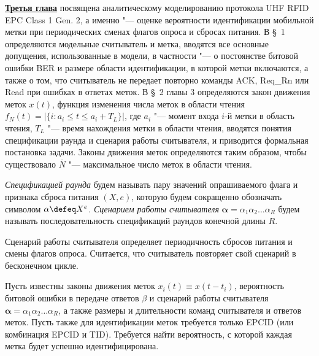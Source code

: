 \underline{\textbf{Третья глава}} посвящена аналитическому моделированию протокола UHF RFID EPC Class 1 Gen. 2, а именно "--- оценке вероятности идентификации мобильной метки при периодических сменах флагов опроса и сбросах питания. В \S~1 определяются модельные считыватель и метка, вводятся все основные допущения, использованные в модели, в частности "--- о постоянстве битовой ошибки BER и размере области идентификации, в которой метки включаются, а также о том, что считыватель не передает повторно команды ACK, Req\_Rn или Read при ошибках в ответах меток. В \S~2 главы 3 определяются закон движения меток $x(t)$, функция изменения числа меток в области чтения $f_N(t) = | \{ i: a_i \leqslant t \leqslant a_i + T_L \} |$, где $a_i$ "--- момент входа $i$-й метки в область чтения, $T_L$ "--- время нахождения метки в области чтения, вводятся понятия спецификации раунда и сценария работы считывателя, и приводится формальная постановка задачи. Законы движения меток определяются таким образом, чтобы существовало $\overline{N}$ "--- максимальное число меток в области чтения.

\begin{defn}
\textit{Спецификацией раунда} будем называть пару значений опрашиваемого флага и признака сброса питания $(X, e)$, которую будем сокращенно обозначать символом $\alpha \defeq X^{e}$. \textit{Сценарием работы считывателя} $\bm{\alpha} = \alpha_1 \alpha_2 \dots \alpha_R$ будем называть последовательность спецификаций раундов конечной длины $R$.
\end{defn}

Сценарий работы считывателя определяет периодичность сбросов питания и смены флагов опроса. Считается, что считыватель повторяет свой сценарий в бесконечном цикле.

\begin{probl}\label{probl:analytic_problem}
  Пусть известны законы движения меток $x_i(t) \equiv x(t - t_i)$, вероятность битовой ошибки в передаче ответов $\beta$ и сценарий работы считывателя $\bm{\alpha} = \alpha_1 \alpha_2 \dots \alpha_R$, а также размеры и длительности команд считывателя и ответов меток. Пусть также для идентификации меток требуется только EPCID (или комбинация EPCID и TID). Требуется найти вероятность, с которой каждая метка будет успешно идентифицирована.
\end{probl}

